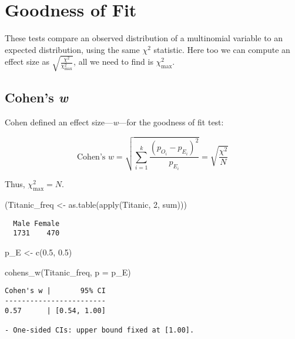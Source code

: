 \documentclass[mathematics,article,submit,moreauthors,pdftex]{mdpi}
\newenvironment{Shaded}{\begin{snugshade}}{\end{snugshade}}
\newcommand{\AttributeTok}[1]{\textcolor[rgb]{0.77,0.63,0.00}{#1}}
\newcommand{\DecValTok}[1]{\textcolor[rgb]{0.00,0.00,0.81}{#1}}
\newcommand{\FloatTok}[1]{\textcolor[rgb]{0.00,0.00,0.81}{#1}}
\newcommand{\FunctionTok}[1]{\textcolor[rgb]{0.00,0.00,0.00}{#1}}
\newcommand{\NormalTok}[1]{#1}
\newcommand{\OtherTok}[1]{\textcolor[rgb]{0.56,0.35,0.01}{#1}}
\begin{document}
\hypertarget{goodness-of-fit}{%
\section{Goodness of Fit}\label{goodness-of-fit}}

These tests compare an observed distribution of a multinomial variable
to an expected distribution, using the same \(\chi^2\) statistic. Here
too we can compute an effect size as
\(\sqrt{\frac{\chi^2}{\chi^2_{\text{max}}}}\), all we need to find is
\(\chi^2_{\text{max}}\).

\hypertarget{cohens-w}{%
\subsection{\texorpdfstring{Cohen's
\emph{w}}{Cohen's w}}\label{cohens-w}}

Cohen \citep{cohen2013statistical} defined an effect
size---\emph{w}---for the goodness of fit test:

\[
\text{Cohen's } w = \sqrt{\sum_{i=1}^{k}{\frac{(p_{O_i}-p_{E_i})^2}{p_{E_i}}}} = \sqrt{\frac{\chi^2}{N}}
\]

Thus, \(\chi^2_\text{max} = N\).

\begin{Shaded}
\begin{Highlighting}[]
\NormalTok{(Titanic\_freq }\OtherTok{\textless{}{-}} \FunctionTok{as.table}\NormalTok{(}\FunctionTok{apply}\NormalTok{(Titanic, }\DecValTok{2}\NormalTok{, sum)))}
\end{Highlighting}
\end{Shaded}

\begin{verbatim}
  Male Female 
  1731    470 
\end{verbatim}

\begin{Shaded}
\begin{Highlighting}[]
\NormalTok{p\_E }\OtherTok{\textless{}{-}} \FunctionTok{c}\NormalTok{(}\FloatTok{0.5}\NormalTok{, }\FloatTok{0.5}\NormalTok{)}

\FunctionTok{cohens\_w}\NormalTok{(Titanic\_freq, }\AttributeTok{p =}\NormalTok{ p\_E)}
\end{Highlighting}
\end{Shaded}

\begin{verbatim}
Cohen's w |       95% CI
------------------------
0.57      | [0.54, 1.00]

- One-sided CIs: upper bound fixed at [1.00].
\end{verbatim}
\end{document}

